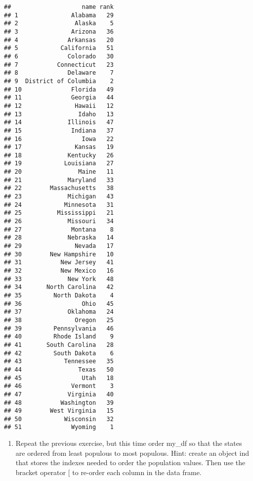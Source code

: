 \documentclass[
]{article}
\newenvironment{Shaded}{\begin{snugshade}}{\end{snugshade}}
\newcommand{\AttributeTok}[1]{\textcolor[rgb]{0.77,0.63,0.00}{#1}}
\newcommand{\FunctionTok}[1]{\textcolor[rgb]{0.00,0.00,0.00}{#1}}
\newcommand{\NormalTok}[1]{#1}
\newcommand{\OtherTok}[1]{\textcolor[rgb]{0.56,0.35,0.01}{#1}}
\newcommand{\SpecialCharTok}[1]{\textcolor[rgb]{0.00,0.00,0.00}{#1}}
\providecommand{\tightlist}{%
  \setlength{\itemsep}{0pt}\setlength{\parskip}{0pt}}
\begin{document}
\begin{verbatim}
##                    name rank
## 1               Alabama   29
## 2                Alaska    5
## 3               Arizona   36
## 4              Arkansas   20
## 5            California   51
## 6              Colorado   30
## 7           Connecticut   23
## 8              Delaware    7
## 9  District of Columbia    2
## 10              Florida   49
## 11              Georgia   44
## 12               Hawaii   12
## 13                Idaho   13
## 14             Illinois   47
## 15              Indiana   37
## 16                 Iowa   22
## 17               Kansas   19
## 18             Kentucky   26
## 19            Louisiana   27
## 20                Maine   11
## 21             Maryland   33
## 22        Massachusetts   38
## 23             Michigan   43
## 24            Minnesota   31
## 25          Mississippi   21
## 26             Missouri   34
## 27              Montana    8
## 28             Nebraska   14
## 29               Nevada   17
## 30        New Hampshire   10
## 31           New Jersey   41
## 32           New Mexico   16
## 33             New York   48
## 34       North Carolina   42
## 35         North Dakota    4
## 36                 Ohio   45
## 37             Oklahoma   24
## 38               Oregon   25
## 39         Pennsylvania   46
## 40         Rhode Island    9
## 41       South Carolina   28
## 42         South Dakota    6
## 43            Tennessee   35
## 44                Texas   50
## 45                 Utah   18
## 46              Vermont    3
## 47             Virginia   40
## 48           Washington   39
## 49        West Virginia   15
## 50            Wisconsin   32
## 51              Wyoming    1
\end{verbatim}

\begin{enumerate}
\def\labelenumi{\arabic{enumi}.}
\setcounter{enumi}{5}
\tightlist
\item
  Repeat the previous exercise, but this time order my\_df so that the
  states are ordered from least populous to most populous. Hint: create
  an object ind that stores the indexes needed to order the population
  values. Then use the bracket operator {[} to re-order each column in
  the data frame.
\end{enumerate}

\begin{Shaded}
\end{Shaded}
\end{document}
